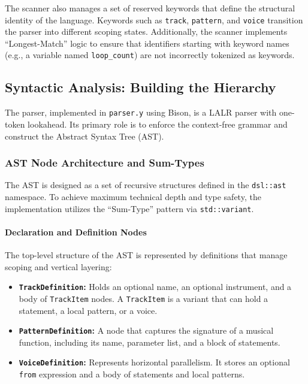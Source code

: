 The scanner also manages a set of reserved keywords that define the structural identity of the language.
Keywords such as \texttt{track}, \texttt{pattern}, and \texttt{voice} transition the parser into different scoping
states.
Additionally, the scanner implements ``Longest-Match'' logic to ensure that identifiers starting with keyword names
(e.g., a variable named \texttt{loop\_count}) are not incorrectly tokenized as keywords.

\subsection{Syntactic Analysis: Building the Hierarchy}\label{subsec:syntactic-analysis:-building-the-hierarchy}

The parser, implemented in \texttt{parser.y} using Bison, is a LALR parser with one-token lookahead.
Its primary role is to enforce the context-free grammar and construct the Abstract Syntax Tree (AST).

\subsubsection{AST Node Architecture and Sum-Types}

The AST is designed as a set of recursive structures defined in the \texttt{dsl::ast} namespace.
To achieve maximum technical depth and type safety, the implementation utilizes the ``Sum-Type'' pattern via
\texttt{std::variant}.

\paragraph{Declaration and Definition Nodes}
The top-level structure of the AST is represented by definitions that manage scoping and vertical layering:
\begin{itemize}
  \item \textbf{\texttt{TrackDefinition}:} Holds an optional name, an optional instrument, and a body of
    \texttt{TrackItem} nodes.
    A \texttt{TrackItem} is a variant that can hold a statement, a local pattern, or a voice.
  \item \textbf{\texttt{PatternDefinition}:} A node that captures the signature of a musical function, including its
    name, parameter list, and a block of statements.
  \item \textbf{\texttt{VoiceDefinition}:} Represents horizontal parallelism.
    It stores an optional \texttt{from} expression and a body of statements and local patterns.
\end{itemize}

